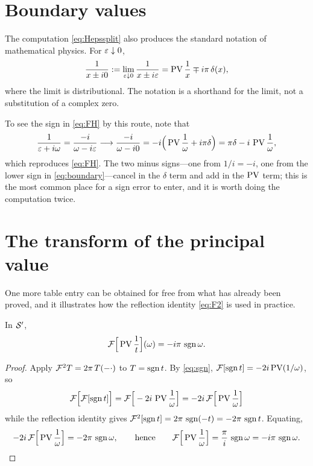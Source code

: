 \section{Boundary values}

The computation \eqref{eq:Hepssplit} also produces the standard notation of mathematical physics.
For $\varepsilon\downarrow0$,
\begin{equation}
\frac{1}{x\pm i0}:=\lim_{\varepsilon\downarrow0}\frac{1}{x\pm i\varepsilon}
=\operatorname{PV}\frac{1}{x}\mp i\pi\,\delta(x),
\label{eq:boundary}
\end{equation}
where the limit is distributional. The notation is a shorthand for the limit, not a substitution of
a complex zero.

To see the sign in \eqref{eq:FH} by this route, note that
\begin{equation}
\frac{1}{\varepsilon+i\omega}=\frac{-i}{\omega-i\varepsilon}\longrightarrow\frac{-i}{\omega-i0}
=-i\Big(\operatorname{PV}\frac{1}{\omega}+i\pi\delta\Big)=\pi\delta-i\,\operatorname{PV}\frac{1}{\omega},
\end{equation}
which reproduces \eqref{eq:FH}. The two minus signs---one from $1/i=-i$, one from the lower sign in
\eqref{eq:boundary}---cancel in the $\delta$ term and add in the $\operatorname{PV}$ term; this is the most
common place for a sign error to enter, and it is worth doing the computation twice.

\section{The transform of the principal value}

One more table entry can be obtained for free from what has already been proved, and it illustrates how
the reflection identity \eqref{eq:F2} is used in practice.

\begin{proposition}\label{prop:PVtransform}
In $\mathcal{S}'$,
\begin{equation}
\mathcal{F}\Big[\operatorname{PV}\frac{1}{t}\Big](\omega)=-i\pi\,\operatorname{sgn}\omega .
\label{eq:PVtransform}
\end{equation}
\end{proposition}

\begin{proof}
Apply $\mathcal{F}^{2}T=2\pi\,T(-\cdot)$ to $T=\operatorname{sgn} t$. By \eqref{eq:sgn},
$\mathcal{F}[\operatorname{sgn} t]=-2i\operatorname{PV}(1/\omega)$, so
\begin{equation}
\mathcal{F}\Big[\mathcal{F}[\operatorname{sgn} t]\Big]=\mathcal{F}\Big[-2i\,\operatorname{PV}\frac{1}{\omega}\Big]=-2i\,\mathcal{F}\Big[\operatorname{PV}\frac{1}{\omega}\Big]
\end{equation}
while the reflection identity gives
$\mathcal{F}^{2}[\operatorname{sgn} t]=2\pi\,\operatorname{sgn}(-t)=-2\pi\,\operatorname{sgn} t$. Equating,
\begin{equation}
-2i\,\mathcal{F}\Big[\operatorname{PV}\frac{1}{\omega}\Big]=-2\pi\,\operatorname{sgn}\omega ,
\qquad\text{hence}\qquad
\mathcal{F}\Big[\operatorname{PV}\frac{1}{\omega}\Big]=\frac{\pi}{i}\,\operatorname{sgn}\omega=-i\pi\,\operatorname{sgn}\omega . \qedhere
\end{equation}
\end{proof}

